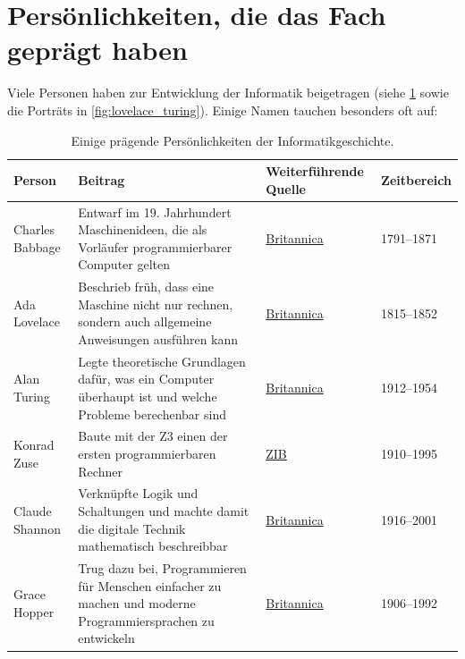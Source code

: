 \section{Persönlichkeiten, die das Fach geprägt haben}

Viele Personen haben zur Entwicklung der Informatik beigetragen (siehe \cref{tab:persoenlichkeiten} sowie die Porträts in \cref{fig:lovelace_turing}). Einige Namen tauchen besonders oft auf:

\begin{table}[H]
    \centering
    \begin{tabular}{l|p{6.1cm}|p{2.8cm}|p{1.8cm}}
        \textbf{Person} & \textbf{Beitrag} & \textbf{Weiterführende Quelle} & \textbf{Zeitbereich} \\ \midrule\midrule
        Charles Babbage & Entwarf im 19. Jahrhundert Maschinenideen, die als Vorläufer programmierbarer Computer gelten & \href{https://www.britannica.com/biography/Charles-Babbage}{Britannica} & 1791--1871 \\ \midrule
        Ada Lovelace & Beschrieb früh, dass eine Maschine nicht nur rechnen, sondern auch allgemeine Anweisungen ausführen kann & \href{https://www.britannica.com/biography/Ada-Lovelace}{Britannica} & 1815--1852 \\ \midrule
        Alan Turing & Legte theoretische Grundlagen dafür, was ein Computer überhaupt ist und welche Probleme berechenbar sind & \href{https://www.britannica.com/biography/Alan-Turing}{Britannica} & 1912--1954 \\ \midrule
        Konrad Zuse & Baute mit der Z3 einen der ersten programmierbaren Rechner & \href{https://www.zib.de/konrad-zuse}{ZIB} & 1910--1995 \\ \midrule
        Claude Shannon & Verknüpfte Logik und Schaltungen und machte damit die digitale Technik mathematisch beschreibbar & \href{https://www.britannica.com/biography/Claude-Shannon}{Britannica} & 1916--2001 \\ \midrule
        Grace Hopper & Trug dazu bei, Programmieren für Menschen einfacher zu machen und moderne Programmiersprachen zu entwickeln & \href{https://www.britannica.com/biography/Grace-Hopper}{Britannica} & 1906--1992 \\
    \end{tabular}
    \caption{Einige prägende Persönlichkeiten der Informatikgeschichte.}
    \label{tab:persoenlichkeiten}
\end{table}

